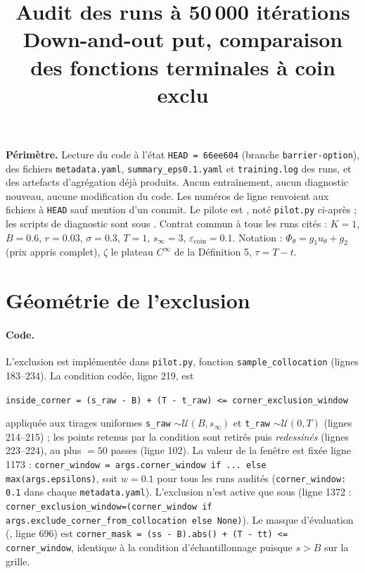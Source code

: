 \documentclass[11pt]{article}
\title{Audit des runs à 50\,000 itérations\\
\large Down-and-out put, comparaison des fonctions terminales à coin exclu}
\author{}
\date{}
\newcommand{\epscoin}{\varepsilon_{\mathrm{coin}}}
\newcommand{\code}[1]{\texttt{#1}}
\begin{document}
\maketitle

\noindent\textbf{Périmètre.} Lecture du code à l'état \code{HEAD = 66ee604}
(branche \code{barrier-option}), des fichiers \code{metadata.yaml},
\code{summary\_eps0.1.yaml} et \code{training.log} des runs, et des artefacts
d'agrégation déjà produits. Aucun entraînement, aucun diagnostic nouveau,
aucune modification du code. Les numéros de ligne renvoient aux fichiers à
\code{HEAD} sauf mention d'un commit. Le pilote est
,
noté \code{pilot.py} ci-après ; les scripts de diagnostic sont sous
.
Contrat commun à tous les runs cités : $K=1$, $B=0.6$, $r=0.03$, $\sigma=0.3$,
$T=1$, $s_\infty=3$, $\epscoin=0.1$. Notation : $\Phi_\theta=g_1u_\theta+g_2$
(prix appris complet), $\zeta$ le plateau $C^\infty$ de la Définition 5,
$\tau=T-t$.

\section{Géométrie de l'exclusion}
\label{sec:exclusion}

\paragraph{Code.} L'exclusion est implémentée dans \code{pilot.py},
fonction \code{sample\_collocation} (lignes 183--234). La condition codée,
ligne 219, est
\begin{center}
\code{inside\_corner = (s\_raw - B) + (T - t\_raw) <= corner\_exclusion\_window}
\end{center}
appliquée aux tirages uniformes \code{s\_raw} $\sim\mathcal U(B,s_\infty)$ et
\code{t\_raw} $\sim\mathcal U(0,T)$ (lignes 214--215) ; les points retenus par
la condition sont retirés puis \emph{redessinés} (lignes 223--224), au plus
 $=50$ passes (ligne 102). La valeur
de la fenêtre est fixée ligne 1173 :
\code{corner\_window = args.corner\_window if ... else max(args.epsilons)}, soit
$w=0.1$ pour tous les runs audités (\code{corner\_window: 0.1} dans chaque
\code{metadata.yaml}). L'exclusion n'est active que sous
 (ligne 1372 :
\code{corner\_exclusion\_window=(corner\_window if args.exclude\_corner\_from\_collocation else None)}).
Le masque d'évaluation (, ligne 696) est
\code{corner\_mask = (ss - B).abs() + (T - tt) <= corner\_window}, identique à
la condition d'échantillonnage puisque $s>B$ sur la grille.
\end{document}
